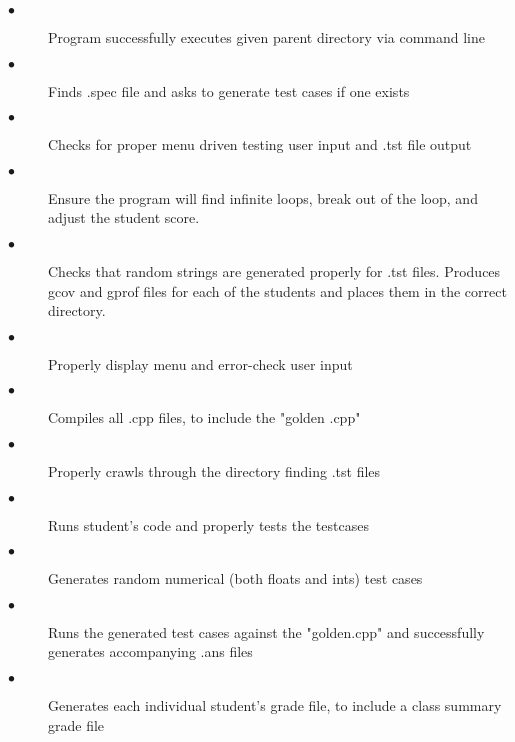 \begin{description}
\item [$\bullet$] Program successfully executes given parent directory via command line
\item [$\bullet$] Finds .spec file and asks to generate test cases if one exists
\item [$\bullet$] Checks for proper menu driven testing user input and .tst file output
\item [$\bullet$] Ensure the program will find infinite loops, break out of the loop, and adjust the student score.
\item [$\bullet$] Checks that random strings are generated properly for .tst files.
\tiem [$\bullet$] Produces gcov and gprof files for each of the students and places them in the correct directory.
\item [$\bullet$] Properly display menu and error-check user input
\item [$\bullet$] Compiles all .cpp files, to include the "golden .cpp"
\item [$\bullet$] Properly crawls through the directory finding .tst files
\item [$\bullet$] Runs student's code and properly tests the testcases
\item [$\bullet$] Generates random numerical (both floats and ints) test cases 
\item [$\bullet$] Runs the generated test cases against the  "golden.cpp" and successfully generates accompanying .ans files
\item [$\bullet$] Generates each individual student's grade file, to include a class summary grade file
\end{description}
